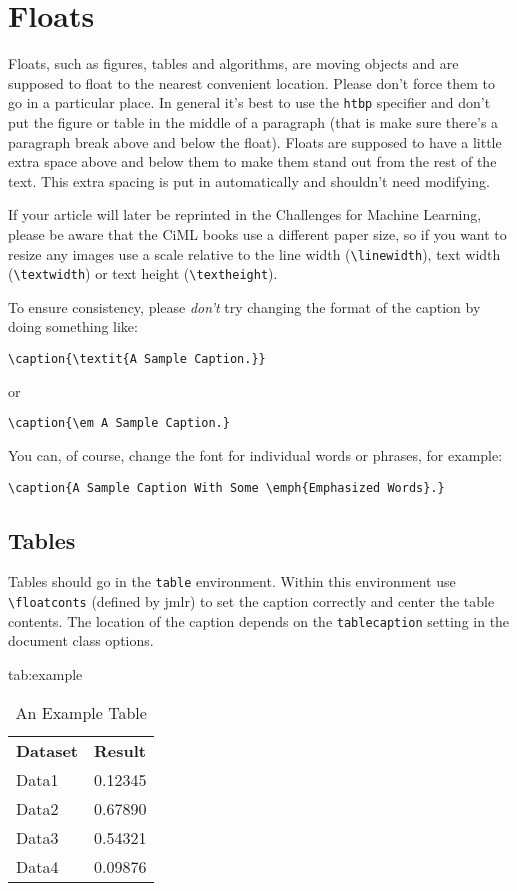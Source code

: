 \documentclass[tablecaption=bottom,wcp]{jmlr} %
\begin{document}
\section{Floats}
\label{sec:floats}

Floats, such as figures, tables and algorithms, are moving
objects and are supposed to float to the nearest convenient
location. Please don't force them to go in a particular place. In
general it's best to use the \texttt{htbp} specifier and don't
put the figure or table in the middle of a paragraph (that is
make sure there's a paragraph break above and below the float).
Floats are supposed to have a little extra space above and below
them to make them stand out from the rest of the text. This extra
spacing is put in automatically and shouldn't need modifying.

If your article will later be reprinted in the Challenges for
Machine Learning, please be aware that the CiML books use a
different paper size, so if you want to resize any images use a
scale relative to the line width (\verb|\linewidth|), text width
(\verb|\textwidth|) or text height (\verb|\textheight|).

To ensure consistency, please \emph{don't} try changing the format of the caption by doing
something like:
\begin{verbatim}
\caption{\textit{A Sample Caption.}}
\end{verbatim}
or
\begin{verbatim}
\caption{\em A Sample Caption.}
\end{verbatim}
You can, of course, change the font for individual words or
phrases, for example:
\begin{verbatim}
\caption{A Sample Caption With Some \emph{Emphasized Words}.}
\end{verbatim}

\subsection{Tables}
\label{sec:tables}

Tables should go in the \texttt{table} environment. Within this
environment use \verb|\floatconts| (defined by \textsf{jmlr})
to set the caption correctly and center the table contents.
The location of the caption depends on the \verb|tablecaption|
setting in the document class options.

\begin{table}[htbp]
  \floatconts
  {tab:example}%
  {\caption{An Example Table}}%
  {\begin{tabular}{ll}
      \bfseries Dataset & \bfseries Result \\
      Data1             & 0.12345          \\
      Data2             & 0.67890          \\
      Data3             & 0.54321          \\
      Data4             & 0.09876
    \end{tabular}}
\end{table}
\end{document}
